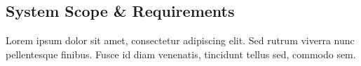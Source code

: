 \subsection*{System Scope \& Requirements}
Lorem ipsum dolor sit amet, consectetur adipiscing elit. Sed rutrum viverra nunc pellentesque finibus. Fusce id diam venenatis, tincidunt tellus sed, commodo sem.

